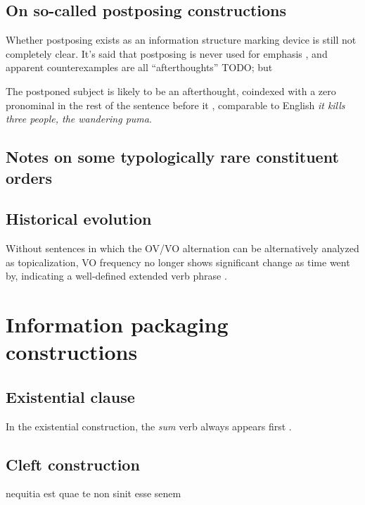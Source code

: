 \documentclass[a4paper, oneside, 12pt]{report}
\newcommand*{\citesec}[1]{\S~{#1}}
\newcommand*{\citepage}[1]{p.~{#1}}
\newcommand{\form}[1]{\emph{#1}}
\begin{document}
\subsection{On so-called postposing constructions}

Whether postposing exists as an information structure marking device 
is still not completely clear. 
It's said that postposing is never used for emphasis \citep[\citepage{395}]{allen1903allen},
and apparent counterexamples are all ``afterthoughts'' TODO;
but 

The postponed subject is likely to be an afterthought, 
coindexed with a zero pronominal 
in the rest of the sentence before it
\citet[\citepage{87}]{devine2006latin},
comparable to English \form{it kills three people, the wandering puma}.

\subsection{Notes on some typologically rare constituent orders}


\subsection{Historical evolution}\label{sec:constituent-order.history}

Without sentences in which the OV/VO alternation 
can be alternatively analyzed as topicalization,
VO frequency no longer shows significant change as time went by,
indicating a well-defined extended verb phrase \citep[\citesec{1.5}, \citepage{29}]{danckaert2017development}.

\section{Information packaging constructions}

\subsection{Existential clause}\label{sec:clause.exist}

In the existential construction,
the \form{sum} verb always appears first
\citep[\citepage{396}]{allen1903allen}.

\subsection{Cleft construction}

nequitia est quae te non sinit esse senem
\end{document}

